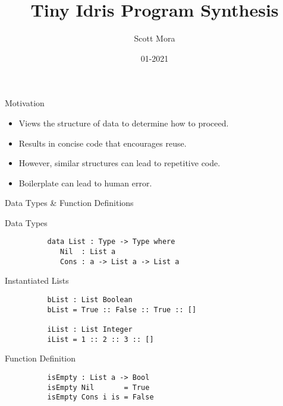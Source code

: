\documentclass[presentation]{beamer}
\author{Scott Mora}
\date{01-2021}
\title{Tiny Idris Program Synthesis}
\begin{document}
\maketitle

\begin{frame}[fragile]{Motivation}
  \begin{itemize}
  \item Views the structure of data to determine how to proceed.\\
  \item Results in concise code that encourages reuse. \\
  \item However, similar structures can lead to repetitive code.\\
  \item Boilerplate can lead to human error.\\
  \end{itemize}
\end{frame}  

\begin{frame}[fragile]{Data Types \& Function Definitions}
      \begin{block}{Data Types}
        \begin{verbatim}
          data List : Type -> Type where
             Nil  : List a
             Cons : a -> List a -> List a
        \end{verbatim}
      \end{block}
      \begin{block}{Instantiated Lists}
        \begin{verbatim}
          bList : List Boolean
          bList = True :: False :: True :: []

          iList : List Integer
          iList = 1 :: 2 :: 3 :: []
        \end{verbatim}
      \end{block}
      \begin{block}{Function Definition}
        \begin{verbatim}
          isEmpty : List a -> Bool
          isEmpty Nil       = True
          isEmpty Cons i is = False
        \end{verbatim}
      \end{block}
\end{frame}
\end{document}
